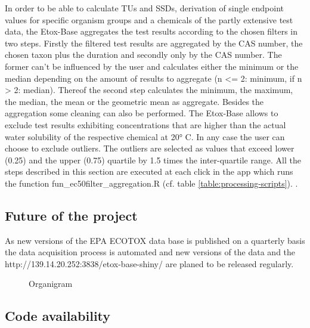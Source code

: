 \documentclass[english]{article}
\newcommand{\etoxbase}{Etox-Base}
\newcommand{\epa}{EPA ECOTOX data base}
\newcommand{\app}{http://139.14.20.252:3838/etox-base-shiny/}
\begin{document}
In order to be able to calculate TUs and SSDs, derivation of single endpoint values for specific organism groups and a chemicals of the partly extensive test data, the \etoxbase{} aggregates the test results according to the chosen filters in two steps. Firstly the filtered test results are aggregated by the CAS number, the chosen taxon plus the duration and secondly only by the CAS number. The former can't be influenced by the user and calculates either the minimum or the median depending on the amount of results to aggregate (n <= 2: minimum, if n > 2: median). Thereof the second step calculates the minimum, the maximum, the median, the mean or the geometric mean as aggregate. Besides the aggregation some cleaning can also be performed. The \etoxbase{} allows to exclude test results exhibiting concentrations that are higher than the actual water solubility of the respective chemical at \ang{20} C. In any case the user can choose to exclude outliers. The outliers are selected as values that exceed lower (0.25) and the upper (0.75) quartile by 1.5 times the inter-quartile range. All the steps described in this section are executed at each click in the app which runs the function fun\_ec50filter\_aggregation.R (cf. table \ref{table:processing-scripts}). \citep{dowle_data.table_2018}.

\subsection*{Future of the project}
As new versions of the \epa{} is published on a quarterly basis the data acquisition process is automated and new versions of the data and the \app{} are planed to be released regularly.


\begin{figure}
    
    \caption{Organigram}
    \label{fig:organigram}
\end{figure}

\subsection*{Code availability}
\end{document}
